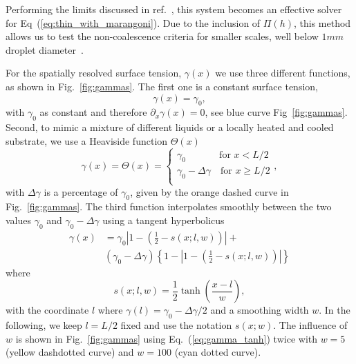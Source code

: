 Performing the limits discussed in ref.~\cite{zitzLatticeBoltzmannMethod2019, zitzLatticeBoltzmannSimulations2021}, this system becomes an effective solver for Eq~(\ref{eq:thin_with_marangoni}).
Due to the inclusion of $\Pi(h)$, this method allows us to test the non-coalescence criteria for smaller scales, well below $1mm$ droplet diameter~\cite{doi:10.1021/la500459v, karpitschka2014sharp}.

For the spatially resolved surface tension, $\gamma(x)$ we use three different functions, as shown in Fig.~\ref{fig:gammas}.
The first one is a constant surface tension, 
\begin{equation}\label{eq:gamma_const}
    \gamma(x) = \gamma_0,
\end{equation}
with $\gamma_0$ as constant and therefore $\partial_x\gamma(x) = 0$, see blue curve Fig~\ref{fig:gammas}.
Second, to mimic a mixture of different liquids or a locally heated and cooled substrate, we use a Heaviside function $\Theta(x)$
\begin{equation}\label{eq:gamma_step}
    \gamma(x) = \Theta(x) = \begin{cases}
    \gamma_0\quad~~\qquad \text{for $x < L/2$}\\
    \gamma_0 - \Delta\gamma \quad \text{for $x \ge L/2$}\\
    \end{cases},
\end{equation}
with $\Delta\gamma$ is a percentage of $\gamma_0$, given by the orange dashed curve in Fig.~\ref{fig:gammas}.
The third function interpolates smoothly between the two values $\gamma_0$ and $\gamma_0 -\Delta\gamma$ using a tangent hyperbolicus
\begin{align}\label{eq:gamma_tanh}
    \gamma(x) &= \gamma_0\left|1 - \left(\frac{1}{2} - s(x;l,w)\right)\right| + \nonumber\\
    &(\gamma_0 - \Delta\gamma)\left\{1 - \left|1 - \left(\frac{1}{2} - s(x;l,w)\right)\right|\right\} 
\end{align}
where
\begin{equation}\label{eq:smoothing}
    s(x;l,w) = \frac{1}{2}\tanh\left(\frac{x - l}{w}\right),
\end{equation}
with the coordinate $l$ where $\gamma(l) = \gamma_0 -\Delta\gamma/2$ and a smoothing width $w$. 
In the following, we keep $l=L/2$ fixed and use the notation $s(x;w)$.
The influence of $w$ is shown in Fig.~\ref{fig:gammas} using Eq.~(\ref{eq:gamma_tanh}) twice with $w=5$ (yellow dashdotted curve) and $w=100$ (cyan dotted curve). 

